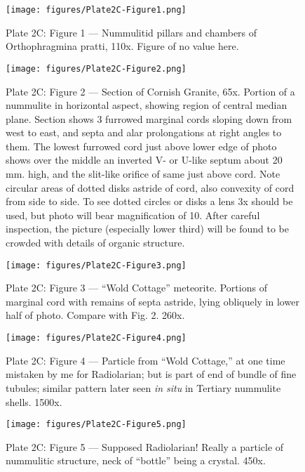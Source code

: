 \documentclass[a4paper, 12pt, oneside]{article}
\begin{document}
\clearpage
{}
\cfoot{\thepage}
\begin{figure}[b]
\centering
\texttt{[image: figures/Plate2C-Figure1.png]}
\caption{\small Plate 2C: Figure 1 --- Nummulitid pillars and chambers of Orthophragmina pratti, 110x. Figure of no value here.}
\end{figure}
\clearpage
\begin{figure}[b]
\centering
\texttt{[image: figures/Plate2C-Figure2.png]}
\caption{\small Plate 2C: Figure 2 --- Section of Cornish Granite, 65x. Portion of a nummulite in horizontal aspect, showing region of central median plane. Section shows 3 furrowed marginal cords sloping down from west to east, and septa and alar prolongations at right angles to them. The lowest furrowed cord just above lower edge of photo shows over the middle an inverted V- or U-like septum about 20 mm. high, and the slit-like orifice of same just above cord. Note circular areas of dotted disks astride of cord, also convexity of cord from side to side. To see dotted circles or disks a lens 3x should be used, but photo will bear magnification of 10. After careful inspection, the picture (especially lower third) will be found to be crowded with details of organic structure.}
\end{figure}
\clearpage
\begin{figure}[b]
\centering
\texttt{[image: figures/Plate2C-Figure3.png]}
\caption{\small Plate 2C: Figure 3 --- ``Wold Cottage'' meteorite. Portions of marginal cord with remains of septa astride, lying obliquely in lower half of photo. Compare with Fig. 2. 260x.}
\end{figure}
\clearpage
\begin{figure}[b]
\centering
\texttt{[image: figures/Plate2C-Figure4.png]}
\caption{\small Plate 2C: Figure 4 --- Particle from ``Wold Cottage,'' at one time mistaken by me for Radiolarian; but is part of end of bundle of fine tubules; similar pattern later seen \emph{in situ} in Tertiary nummulite shells. 1500x.}
\end{figure}
\clearpage
\begin{figure}[b]
\centering
\texttt{[image: figures/Plate2C-Figure5.png]}
\caption{\small Plate 2C: Figure 5 --- Supposed Radiolarian! Really a particle of nummulitic structure, neck of ``bottle'' being a crystal. 450x.}
\end{figure}
\clearpage
\end{document}

